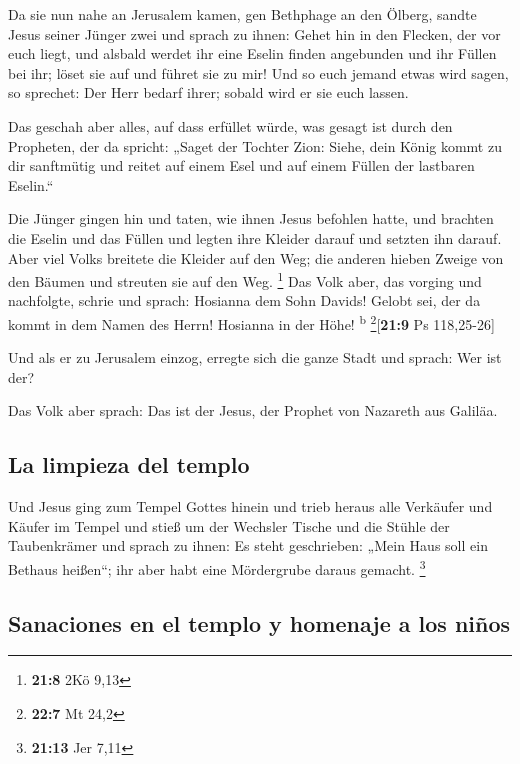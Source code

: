  Da sie nun nahe an Jerusalem kamen, gen Bethphage an den
Ölberg, sandte Jesus seiner Jünger zwei  und sprach zu
ihnen: Gehet hin in den Flecken, der vor euch liegt, und alsbald werdet
ihr eine Eselin finden angebunden und ihr Füllen bei ihr; löset sie auf
und führet sie zu mir!  Und so euch jemand etwas wird
sagen, so sprechet: Der Herr bedarf ihrer; sobald wird er sie euch
lassen.

 Das geschah aber alles, auf dass erfüllet würde, was
gesagt ist durch den Propheten, der da spricht:  „Saget
der Tochter Zion: Siehe, dein König kommt zu dir sanftmütig und reitet
auf einem Esel und auf einem Füllen der lastbaren Eselin.``

 Die Jünger gingen hin und taten, wie ihnen Jesus befohlen
hatte,  und brachten die Eselin und das Füllen und legten
ihre Kleider darauf und setzten ihn darauf.  Aber viel
Volks breitete die Kleider auf den Weg; die anderen hieben Zweige von
den Bäumen und streuten sie auf den Weg. \footnote{\textbf{21:8} 2Kö
  9,13}  Das Volk aber, das vorging und nachfolgte, schrie
und sprach: Hosianna dem Sohn Davids! Gelobt sei, der da kommt in dem
Namen des Herrn! Hosianna in der Höhe! \textsuperscript{b}
\footnote{\textbf{22:7} Mt 24,2}{[}\textbf{21:9} Ps 118,25-26{]}

 Und als er zu Jerusalem einzog, erregte sich die ganze
Stadt und sprach: Wer ist der?

 Das Volk aber sprach: Das ist der Jesus, der Prophet von
Nazareth aus Galiläa.

\hypertarget{la-limpieza-del-templo}{%
\subsection{La limpieza del templo}\label{la-limpieza-del-templo}}

 Und Jesus ging zum Tempel Gottes hinein und trieb heraus
alle Verkäufer und Käufer im Tempel und stieß um der Wechsler Tische und
die Stühle der Taubenkrämer  und sprach zu ihnen: Es
steht geschrieben: „Mein Haus soll ein Bethaus heißen``; ihr aber habt
eine Mördergrube daraus gemacht. \footnote{\textbf{21:13} Jer 7,11}

\hypertarget{sanaciones-en-el-templo-y-homenaje-a-los-niuxf1os}{%
\subsection{Sanaciones en el templo y homenaje a los
niños}\label{sanaciones-en-el-templo-y-homenaje-a-los-niuxf1os}}

